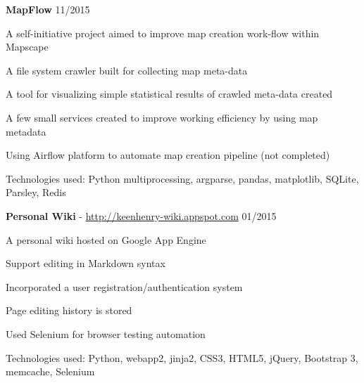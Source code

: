 \documentclass[margin,line]{resume}
\begin{document}
\begin{resume}
    \textbf{MapFlow} \hfill 11/2015 \vspace{-3mm}\\\vspace{-1mm}%
      \begin{list2}
       \item A self-initiative project aimed to improve map creation work-flow within Mapscape
       \item A file system crawler built for collecting map meta-data
       \item A tool for visualizing simple statistical results of crawled meta-data created
       \item A few small services created to improve working efficiency by using map metadata
       \item Using Airflow platform to automate map creation pipeline (not completed)
       \item Technologies used: Python multiprocessing, argparse, pandas, matplotlib, SQLite, Parsley, Redis
      \end{list2}


    \textbf{Personal Wiki} - \url{http://keenhenry-wiki.appspot.com} \hfill 01/2015 \vspace{-3mm}\\\vspace{-1mm}%
      \begin{list2}
       \item A personal wiki hosted on Google App Engine
       \item Support editing in Markdown syntax
       \item Incorporated a user registration/authentication system
       \item Page editing history is stored
       \item Used Selenium for browser testing automation
       \item Technologies used: Python, webapp2, jinja2, CSS3, HTML5, jQuery, Bootstrap 3, memcache, Selenium
      \end{list2}



\end{resume}
\end{document}
